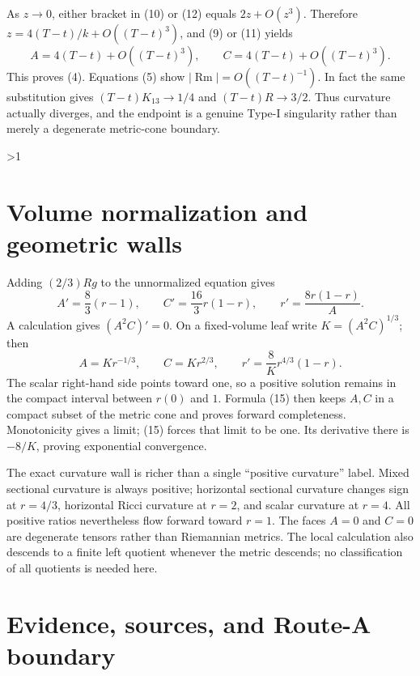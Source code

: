 \documentclass[10pt]{article}
\providecommand{\CRevisionRound}{2}
\theoremstyle{remark}
\newcommand{\Rm}{\operatorname{Rm}}
\begin{document}
As $z\to0$, either bracket in (10) or (12) equals $2z+O(z^3)$.
Therefore $z=4(T-t)/k+O((T-t)^3)$, and (9) or (11) yields
\[
 A=4(T-t)+O((T-t)^3),\qquad
 C=4(T-t)+O((T-t)^3).
\]
This proves (4).  Equations (5) show
$|\Rm|=O((T-t)^{-1})$.  In fact the same substitution gives
$(T-t)K_{13}\to1/4$ and $(T-t)R\to3/2$.  Thus curvature actually diverges,
and the endpoint is a genuine Type-I singularity rather than merely a
degenerate metric-cone boundary.
\fi

\ifnum\CRevisionRound>1
\section{Volume normalization and geometric walls}

Adding $(2/3)Rg$ to the unnormalized equation gives
\begin{equation}
 A'=\frac83(r-1),\qquad
 C'=\frac{16}{3}r(1-r),\qquad
 r'=\frac{8r(1-r)}A.                                \label{eq:normalized}
\end{equation}
A calculation gives $(A^2C)'=0$.  On a fixed-volume leaf write
$K=(A^2C)^{1/3}$; then
\begin{equation}
 A=Kr^{-1/3},\qquad C=Kr^{2/3},\qquad
 r'=\frac8K r^{4/3}(1-r).                            \label{eq:scalar-norm}
\end{equation}
The scalar right-hand side points toward one, so a positive solution remains
in the compact interval between $r(0)$ and $1$.  Formula (15) then keeps
$A,C$ in a compact subset of the metric cone and proves forward completeness.
Monotonicity gives a limit; (15) forces that limit to be one.  Its derivative
there is $-8/K$, proving exponential convergence.

The exact curvature wall is richer than a single ``positive curvature''
label.  Mixed sectional curvature is always positive; horizontal sectional
curvature changes sign at $r=4/3$, horizontal Ricci curvature at $r=2$, and
scalar curvature at $r=4$.  All positive ratios nevertheless flow forward
toward $r=1$.  The faces $A=0$ and $C=0$ are degenerate tensors rather than
Riemannian metrics.  The local calculation also descends to a finite left
quotient whenever the metric descends; no classification of all quotients is
needed here.

\section{Evidence, sources, and Route-A boundary}
\end{document}
